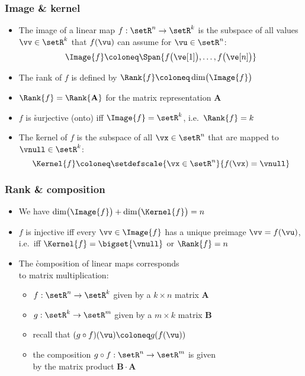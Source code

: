 \begin{frame}
  \frametitle{Image \& kernel}

  \begin{itemize}
  \item The \h{image} of a linear map $f: \setR^n\to \setR^k$ is the subspace
    of all values $\vv\in \setR^k$ that $f(\vu)$ can assume for $\vu\in \setR^n$:
    \[
    \Image{f} \coloneq \Span{f\bigl(\ve[1]\bigr), \ldots, f\bigl(\ve[n]\bigr)}
    \]
    \pause\ungap
  \item The \h{rank} of $f$ is defined by $\Rank{f} \coloneq \dim \bigl(
    \Image{f} \bigr)$
  \item $\Rank{f} = \Rank{\mathbf{A}}$ for the matrix representation $\mathbf{A}$
  \item $f$ is \h{surjective} (onto) iff $\Image{f} = \setR^k$, i.e.\
    $\Rank{f} = k$%
    \pause\gap
  \item The \h{kernel} of $f$ is the subspace of all $\vx\in \setR^n$ that are
    mapped to $\vnull\in \setR^k$:
    \[
    \Kernel{f} \coloneq \setdefscale{\vx\in\setR^n}{f(\vx) = \vnull}
    \]
  \end{itemize}
\end{frame}

\begin{frame}
  \frametitle{Rank \& composition}

  \begin{itemize}
  \item We have $\dim \bigl(\Image{f}\bigr) + \dim \bigl( \Kernel{f} \bigr) = n$
  \item $f$ is \h{injective} iff every $\vv\in \Image{f}$ has a unique
    preimage $\vv = f(\vu)$, i.e.\ iff $\Kernel{f} = \bigset{\vnull}$ or
    $\Rank{f} = n$%
    \pause\gap
  \item The \h{composition} of linear maps corresponds\\
    to matrix multiplication:%
    \pause
    \begin{itemize}
    \item $f: \setR^n \to \setR^k$ given by a $k\times n$ matrix $\mathbf{A}$
    \item $g: \setR^k\to \setR^m$ given by a $m\times k$ matrix $\mathbf{B}$
    \item recall that $(g\circ f)(\vu) \coloneq g(f(\vu))$%
      \pause
    \item[\So] the composition $g\circ f: \setR^n\to \setR^m$ is given\\
      by the matrix product $\mathbf{B}\cdot \mathbf{A}$
    \end{itemize}
  \end{itemize}
\end{frame}


